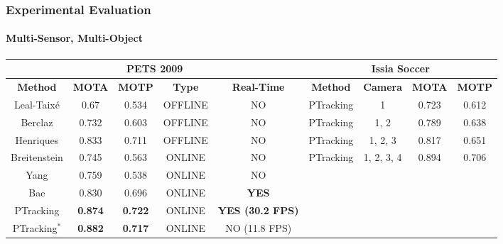 \begin{frame}
	\frametitle{Experimental Evaluation}
	\framesubtitle{Multi-Sensor, Multi-Object}
	
	\vspace{0.2cm}
	
	\begin{center}
	\end{center}
	
	\tiny
	
	\vspace{-0.3cm}

	\begin{table}[!t]
		\renewcommand{\arraystretch}{1.25}
		\setlength{\tabcolsep}{0.14cm}
		\centering
		\begin{tabular}{ccccc|cccc}
			\cline{1-9}
			\multicolumn{5}{c|}{\textbf{PETS 2009}} & \multicolumn{4}{c}{\textbf{Issia Soccer}} \\
			\hline
			\textbf{Method} & \textbf{MOTA} & \textbf{MOTP} & \textbf{Type} & \textbf{Real-Time} &
			\textbf{Method} & \textbf{Camera} & \textbf{MOTA} & \textbf{MOTP} \\
			Leal-Taix\'{e} \cite{Leal11} & 0.67 & 0.534 & OFFLINE & NO & PTracking & 1 & 0.723 & 0.612
			\\
			Berclaz \cite{Berclaz11} & 0.732 & 0.603 & OFFLINE & NO & PTracking & 1, 2 & 0.789 & 0.638
			\\
			Henriques \cite{Henriques11} & 0.833 & 0.711 & OFFLINE & NO & PTracking & 1, 2, 3 & 0.817 &
			0.651 \\
			Breitenstein \cite{Breitenstein11} & 0.745 & 0.563 & ONLINE & NO & PTracking & 1, 2, 3, 4 &
			0.894 & 0.706 \\
			Yang \cite{Yang09} & 0.759 & 0.538 & ONLINE & NO \\
			Bae \cite{Bae14} & 0.830 & 0.696 & ONLINE & \textbf{YES} \\
			PTracking & \textbf{0.874} & \textbf{0.722} & ONLINE & \textbf{YES (30.2 FPS)} \\
			PTracking$^*$ & \textbf{0.882} & \textbf{0.717} & ONLINE & NO (11.8 FPS) \\
			\hline
		\end{tabular}
	\end{table}
	

\end{frame}
